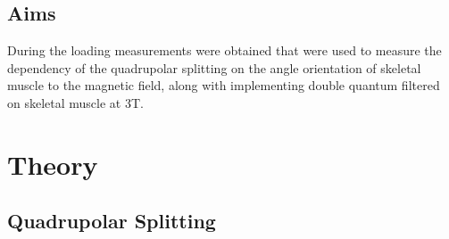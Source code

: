 \documentclass[class=article, crop=false]{standalone}
\begin{document}
\subsection{Aims}

During the loading measurements were obtained that were used to measure the dependency of the quadrupolar splitting on the angle orientation of skeletal muscle to the magnetic field, along with implementing double quantum filtered on skeletal muscle at 3T.

\section{Theory}
\subsection{Quadrupolar Splitting}
\end{document}
